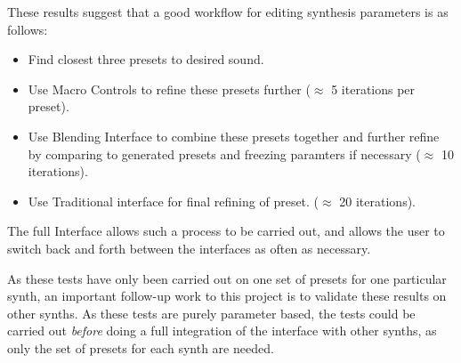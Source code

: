 \documentclass[11pt, oneside]{report}   	%
\begin{document}
These results suggest that a good workflow for editing synthesis parameters is as follows:
\vspace{-3em}
\begin{itemize}
	\setlength\itemsep{-1.2em}
	\item Find closest three presets to desired sound.
	\item Use Macro Controls to refine these presets further ($\approx$ 5 iterations per preset).
	\item Use Blending Interface to combine these presets together and further refine by comparing to generated presets and freezing paramters if necessary ($\approx$ 10 iterations).
	\item Use Traditional interface for final refining of preset. ($\approx$ 20 iterations).
\end{itemize}
\vspace{-10pt}
The full Interface allows such a process to be carried out, and allows the user to switch back and forth between the interfaces as often as necessary.

As these tests have only been carried out on one set of presets for one particular synth, an important follow-up work to this project is to validate these results on other synths. As these tests are purely parameter based, the tests could be carried out \emph{before} doing a full integration of the interface with other synths, as only the set of presets for each synth are needed.
\end{document}
